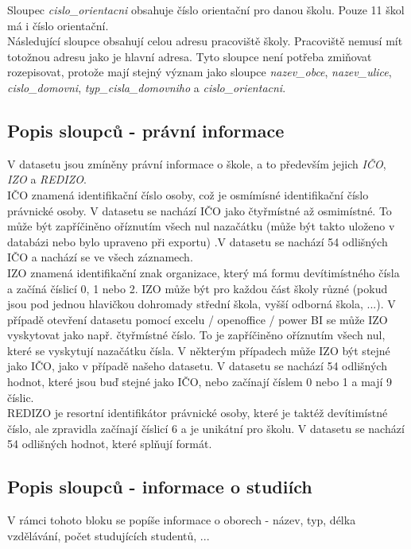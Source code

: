 \documentclass[12pt, a4paper]{article}
\begin{document}
Sloupec \textit{cislo\_orientacni} obsahuje číslo orientační pro danou školu. Pouze 11 škol má i číslo orientační. \\

\noindent Následující sloupce obsahují celou adresu pracoviště školy. Pracoviště nemusí mít totožnou adresu jako je hlavní adresa. Tyto sloupce není potřeba zmiňovat \/ rozepisovat, protože mají stejný význam jako sloupce \textit{nazev\_obce}, \textit{nazev\_ulice}, \textit{cislo\_domovni}, \textit{typ\_cisla\_domovniho} a \textit{cislo\_orientacni}.

\subsection{Popis sloupců - právní informace}
V datasetu jsou zmíněny právní informace o škole, a to především jejich \textit{IČO}, \textit{IZO} a \textit{REDIZO}.\\
IČO znamená identifikační číslo osoby, což je osmímísné identifikační číslo právnické osoby. V datasetu se nachází IČO jako čtyřmístné až osmimístné. To může být zapříčiněno oříznutím všech nul nazačátku (může být takto uloženo v databázi nebo bylo upraveno při exportu) .V datasetu se nachází 54 odlišných IČO a nachází se ve všech záznamech.\\

IZO znamená identifikační znak organizace, který má formu devítimístného čísla a začíná číslicí 0, 1 nebo 2. IZO může být pro každou část školy různé (pokud jsou pod jednou hlavičkou dohromady střední škola, vyšší odborná škola, ...). V případě otevření datasetu pomocí excelu / openoffice / power BI se může IZO vyskytovat jako např. čtyřmístné číslo. To je zapříčiněno oříznutím všech nul, které se vyskytují nazačátku čísla. V některým případech může IZO být stejné jako IČO, jako v případě našeho datasetu. V datasetu se nachází 54 odlišných hodnot, které jsou buď stejné jako IČO, nebo začínají číslem 0 nebo 1 a mají 9 číslic.\\

REDIZO je resortní identifikátor právnické osoby, které je taktéž devítimístné číslo, ale zpravidla začínají číslicí 6 a je unikátní pro školu. V datasetu se nachází 54 odlišných hodnot, které splňují formát.

\subsection{Popis sloupců - informace o studiích}
V rámci tohoto bloku se popíše informace o oborech - název, typ, délka vzdělávání, počet studujících studentů, ...\\
\end{document}
